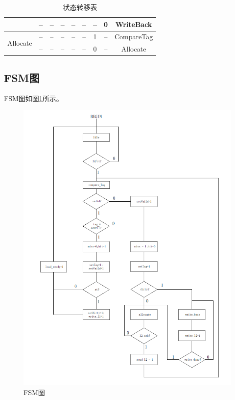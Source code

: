 \documentclass{../source/zjureport}
\begin{document}
\begin{table}[H]
\begin{tabular}{|c|c|c|c|c|c|c|c|c|}
                                        & --          & --          & --                            & --             & --             & --               & 0                    & WriteBack                   \\ \hline
            \multirow{2}{*}{Allocate}   & --          & --          & --                            & --             & --             & 1                & --                   & CompareTag                  \\ \cline{2-9} 
                                        & --          & --          & --                            & --             & --             & 0                & --                   & Allocate                    \\ \hline
            \end{tabular}
            \caption{状态转移表}
            \label{状态转移表}
            \end{table}
        \subsection{FSM图}
        FSM图如图\ref{FSM}所示。
        \begin{figure}[H]
            \centering
            \includegraphics[scale = 0.6]{figure/FSM.png}
            \caption{FSM图}
            \label{FSM}
        \end{figure}
\end{document}
